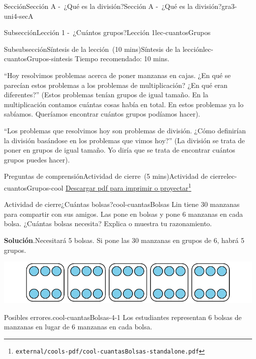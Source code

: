 \documentclass[oneside,10pt,]{article}
\newcommand{\blocktitlefont}{\relax}
\begin{document}
\begin{sectionptx}{Sección}{Sección A -~¿Qué es la división?}{}{Sección A -~¿Qué es la división?}{}{}{gra3-uni4-secA}
\begin{subsectionptx}{Subsección}{Lección 1 -~¿Cuántos grupos?}{}{Lección 1}{}{}{lec-cuantosGrupos}
\begin{subsubsectionptx}{Subsubsección}{Síntesis de la lección~(10 mins)}{}{Síntesis de la lección}{}{}{lec-cuantosGrupos-sintesis}
Tiempo recomendado: 10 mins.%
\par
``Hoy resolvimos problemas acerca de poner manzanas en cajas. ¿En qué se parecían estos problemas a los problemas de multiplicación? ¿En qué eran diferentes?'' (Estos problemas tenían grupos de igual tamaño. En la multiplicación contamos cuántas cosas había en total. En estos problemas ya lo sabíamos. Queríamos encontrar cuántos grupos podíamos hacer).%
\par
``Los problemas que resolvimos hoy son problemas de división. ¿Cómo definirían la división basándose en los problemas que vimos hoy?'' (La división se trata de poner en grupos de igual tamaño. Yo diría que se trata de encontrar cuántos grupos puedes hacer).%
\end{subsubsectionptx}
%
%
\typeout{************************************************}
\typeout{************************************************}
%
\begin{reading-questions-subsubsection}{Preguntas de comprensión}{Actividad de cierre~(5 mins)}{}{Actividad de cierre}{}{}{lec-cuantosGrupos-cool}
\href{external/cools-pdf/cool-cuantasBolsas-standalone.pdf}{Descargar pdf para imprimir o proyectar}\footnote{\nolinkurl{external/cools-pdf/cool-cuantasBolsas-standalone.pdf}\label{lec-cuantosGrupos-cool-5}}\begin{project}{Actividad de cierre}{¿Cuántas bolsas?}{cool-cuantasBolsas}%
Lin tiene 30 manzanas para compartir con sus amigos. Las pone en bolsas y pone 6 manzanas en cada bolsa. ¿Cuántas bolsas necesita? Explica o muestra tu razonamiento.%
\par\smallskip%
\noindent\textbf{\blocktitlefont Solución}.\hypertarget{cool-cuantasBolsas-3}{}\quad{}Necesitará 5 bolsas. Si pone las 30 manzanas en grupos de 6, habrá 5 grupos.%
\begin{image}{0}{1}{0}{}%
\includegraphics[width=\linewidth]{external/svg-source/tikz-file-147473.pdf}
\end{image}%
\end{project}%
\par
\begin{paragraphs}{Posibles errores.}{cool-cuantasBolsas-4-1}%
Los estudiantes representan 6 bolsas de manzanas en lugar de 6 manzanas en cada bolsa.%

\end{paragraphs}
\end{reading-questions-subsubsection}
\end{subsectionptx}
\end{sectionptx}
\end{document}
